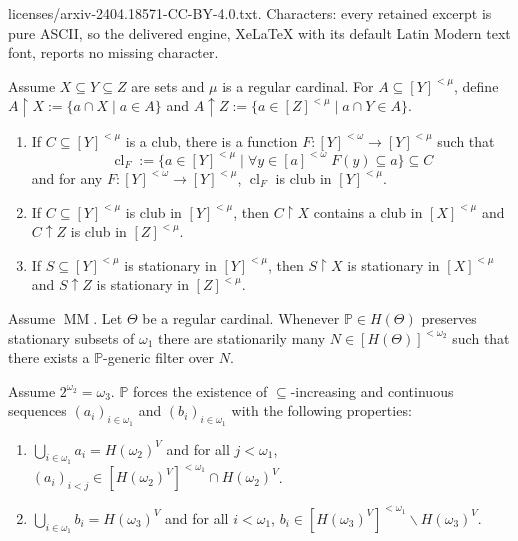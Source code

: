 \documentclass[10pt,a4paper]{amsart}
\DeclareMathOperator{\MM}{MM}
\DeclareMathOperator{\cl}{cl}
\newcommand{\dP}{\mathbb{P}}
\newcommand{\uhr}{\upharpoonright}
\begin{document}
licenses/arxiv-2404.18571-CC-BY-4.0.txt. Characters: every retained excerpt is pure ASCII, so the delivered engine, XeLaTeX with its default Latin Modern text font, reports no missing character.
	\begin{myfact}[Menas]\label{FactMenas}
		Assume $X\subseteq Y\subseteq Z$ are sets and $\mu$ is a regular cardinal. For $A\subseteq [Y]^{<\mu}$, define $A\uhr X:=\{a\cap X\;|\; a\in A\}$ and $A\uparrow Z:=\{a\in[Z]^{<\mu}\;|\;a\cap Y\in A\}$.
		
		\begin{enumerate}
			\item If $C\subseteq[Y]^{<\mu}$ is a club, there is a function $F\colon[Y]^{<\omega}\to[Y]^{<\mu}$ such that
			$$\cl_F:=\{a\in[Y]^{<\mu}\;|\;\forall y\in[a]^{<\omega}\;F(y)\subseteq a\}\subseteq C$$
			and for any $F\colon[Y]^{<\omega}\to[Y]^{<\mu}$, $\cl_F$ is club in $[Y]^{<\mu}$.
			\item If $C\subseteq[Y]^{<\mu}$ is club in $[Y]^{<\mu}$, then $C\uhr X$ contains a club in $[X]^{<\mu}$ and $C\uparrow Z$ is club in $[Z]^{<\mu}$.
			\item If $S\subseteq[Y]^{<\mu}$ is stationary in $[Y]^{<\mu}$, then $S\uhr X$ is stationary in $[X]^{<\mu}$ and $S\uparrow Z$ is stationary in $[Z]^{<\mu}$.
		\end{enumerate}
	\end{myfact}

	\begin{myfact}[Woodin]\label{FactWoodin}
		Assume $\MM$. Let $\Theta$ be a regular cardinal. Whenever $\dP\in H(\Theta)$ preserves stationary subsets of $\omega_1$ there are stationarily many $N\in[H(\Theta)]^{<\omega_2}$ such that there exists a $\dP$-generic filter over $N$.
	\end{myfact}

	\begin{mylem}\label{PSeq}
		Assume $2^{\omega_2}=\omega_3$. $\dP$ forces the existence of $\subseteq$-increasing and continuous sequences $(a_i)_{i\in\omega_1}$ and $(b_i)_{i\in\omega_1}$ with the following properties:
		\begin{enumerate}
			\item $\bigcup_{i\in\omega_1}a_i=H(\omega_2)^V$ and for all $j<\omega_1$, $(a_i)_{i<j}\in[H(\omega_2)^V]^{<\omega_1}\cap H(\omega_2)^V$.
			\item $\bigcup_{i\in\omega_1}b_i=H(\omega_3)^V$ and for all $i<\omega_1$, $b_i\in[H(\omega_3)^V]^{<\omega_1}\smallsetminus H(\omega_3)^V$.
		\end{enumerate}
	\end{mylem}
\end{document}
